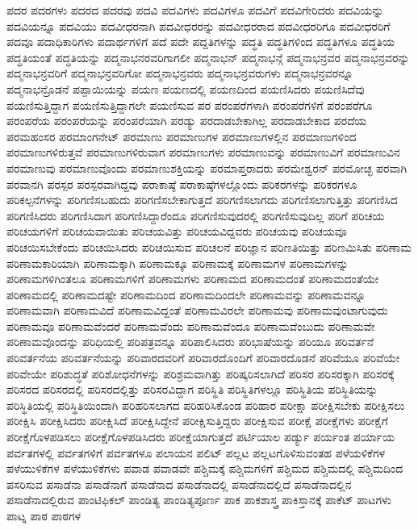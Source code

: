 {ಪದರ
ಪದರಗಳು
ಪದರದ
ಪದರವು
ಪದವಿ
ಪದವಿಗಳು
ಪದವಿಗಳೂ
ಪದವಿಗೆ
ಪದವಿಗೇರಿದರು
ಪದವಿಯನ್ನು
ಪದವಿಯನ್ನೂ
ಪದವಿಯು
ಪದವೀಧರನಾಗಿ
ಪದವೀಧರರನ್ನು
ಪದವೀಧರರಾದ
ಪದವೀಧರರಿಗೂ
ಪದವೀಧರರಿಗೆ
ಪದವೂ
ಪದಾಧಿಕಾರಿಗಳು
ಪದಾರ್ಥಗಳಿಗೆ
ಪದೆ
ಪದೇ
ಪದ್ದತಿಗಳನ್ನು
ಪದ್ಧತಿ
ಪದ್ಧತಿಗಳಿಂದ
ಪದ್ಧತಿಗಳೂ
ಪದ್ಧತಿಯ
ಪದ್ಧತಿಯಂತೆ
ಪದ್ಧತಿಯನ್ನು
ಪದ್ಮನಾಭನರವರಿಗಾಗಲೀ
ಪದ್ಮನಾಭನ್
ಪದ್ಮನಾಭನ್ಗೆ
ಪದ್ಮನಾಭನ್ರವರ
ಪದ್ಮನಾಭನ್ರವರನ್ನು
ಪದ್ಮನಾಭನ್ರವರಿಗೆ
ಪದ್ಮನಾಭನ್ರವರಿಗೋ
ಪದ್ಮನಾಭನ್ರವರು
ಪದ್ಮನಾಭನ್ರವರುಗಳು
ಪದ್ಮನಾಭನ್ರವರನ್ನೂ
ಪದ್ಮನಾಭನ್ರೊಡನೆ
ಪಪ್ಪಾಯಿಯನ್ನು
ಪಯಣ
ಪಯಣದಲ್ಲಿ
ಪಯಣದಿಂದ
ಪಯಣಿಸಿದರು
ಪಯಣಿಸಿದೆವು
ಪಯಣಿಸುತ್ತಿದ್ದಾಗ
ಪಯಣಿಸುತ್ತಿದ್ದಾಗಲೇ
ಪಯಣಿಸುವ
ಪರ
ಪರಂಪರೆಗಳಾಗಿ
ಪರಂಪರೆಗಳಿಗೆ
ಪರಂಪರೆಗೂ
ಪರಂಪರೆಯ
ಪರಂಪರೆಯನ್ನು
ಪರಂಪರೆಯಾಗಿ
ಪರಡ್ಯು
ಪರದಾಡಬೇಕಾಗಿಲ್ಲ
ಪರದಾಡಬೇಕಾದ
ಪರದೆಯ
ಪರಮಹಂಸರ
ಪರಮಾಂಗನೇಟ್
ಪರಮಾಣು
ಪರಮಾಣುಗಳ
ಪರಮಾಣುಗಳಲ್ಲಿನ
ಪರಮಾಣುಗಳಿಂದ
ಪರಮಾಣುಗಳಿರುತ್ತವೆ
ಪರಮಾಣುಗಳಿರುವಾಗ
ಪರಮಾಣುಗಳು
ಪರಮಾಣುವನ್ನು
ಪರಮಾಣುವಿಗೆ
ಪರಮಾಣುವಿನ
ಪರಮಾಣುವು
ಪರಮಾಣುವೊಂದು
ಪರಮಾಣುಶಕ್ತಿಯನ್ನು
ಪರಮಾಪ್ತರಾದರು
ಪರಮೇಶ್ವರನ್
ಪರಮೋಚ್ಛ
ಪರವಾಗಿ
ಪರವಾನಗಿ
ಪರಸ್ಪರ
ಪರಸ್ಪರವಾಗಿದ್ದವು
ಪರಾಕಾಷ್ಠೆ
ಪರಾಕಾಷ್ಠೆಗಳಲ್ಲೊಂದು
ಪರಿಕರಗಳನ್ನು
ಪರಿಕರಗಳೂ
ಪರಿಕಲ್ಪನೆಗಳನ್ನು
ಪರಿಗಣಿಸಬಹುದು
ಪರಿಗಣಿಸಬೇಕಾಗುತ್ತದೆ
ಪರಿಗಣಿಸಲಾಗದು
ಪರಿಗಣಿಸಲಾಗುತ್ತಿತ್ತು
ಪರಿಗಣಿಸಿದ
ಪರಿಗಣಿಸಿದರು
ಪರಿಗಣಿಸಿದಾಗ
ಪರಿಗಣಿಸಿದ್ದಾರೆಂದೂ
ಪರಿಗಣಿಸುವುದರಲ್ಲಿ
ಪರಿಗಣಿಸುವುದಿಲ್ಲ
ಪರಿಗೆ
ಪರಿಚಯ
ಪರಿಚಯಗಳಿಗೆ
ಪರಿಚಯವಾಯಿತು
ಪರಿಚಯವಿತ್ತು
ಪರಿಚಯವಿದ್ದವರು
ಪರಿಚಯವು
ಪರಿಚಯವೂ
ಪರಿಚಯಿಸಬೇಕೆಂದು
ಪರಿಚಯಿಸಿದರು
ಪರಿಚಯಿಸುವ
ಪರಿಚಲನೆ
ಪರಿಜ್ಞಾನ
ಪರಿಣತಿಯಿತ್ತು
ಪರಿಣಮಿಸಿತು
ಪರಿಣಾಮ
ಪರಿಣಾಮಕಾರಿಯಾಗಿ
ಪರಿಣಾಮಕ್ಕಾಗಿ
ಪರಿಣಾಮಕ್ಕೂ
ಪರಿಣಾಮಕ್ಕೆ
ಪರಿಣಾಮಗಳ
ಪರಿಣಾಮಗಳನ್ನು
ಪರಿಣಾಮಗಳಿಗಿಂತಲೂ
ಪರಿಣಾಮಗಳಿಗೆ
ಪರಿಣಾಮಗಳು
ಪರಿಣಾಮದ
ಪರಿಣಾಮದಂತೆ
ಪರಿಣಾಮದಂತೆಯೇ
ಪರಿಣಾಮದಲ್ಲಿ
ಪರಿಣಾಮದಷ್ಟೇ
ಪರಿಣಾಮದಿಂದ
ಪರಿಣಾಮದಿಂದಲೇ
ಪರಿಣಾಮವನ್ನು
ಪರಿಣಾಮವನ್ನೂ
ಪರಿಣಾಮವಾಗಿ
ಪರಿಣಾಮವಿದೆ
ಪರಿಣಾಮವಿದ್ದಂತೆ
ಪರಿಣಾಮವಿರಲೇ
ಪರಿಣಾಮವು
ಪರಿಣಾಮವುಂಟಾಗುವುದು
ಪರಿಣಾಮವೂ
ಪರಿಣಾಮವೆಂದರೆ
ಪರಿಣಾಮವೆಂದು
ಪರಿಣಾಮವೆಂದೂ
ಪರಿಣಾಮವೆಂಬುದು
ಪರಿಣಾಮವೇ
ಪರಿಣಾಮವೊಂದನ್ನು
ಪರಿಧಿಯಲ್ಲಿ
ಪರಿಪತ್ರವನ್ನೂ
ಪರಿಪಾಲಿಸಿದರು
ಪರಿಭಾಷೆಯನ್ನು
ಪರಿಯೂ
ಪರಿವರ್ತನೆ
ಪರಿವರ್ತನೆಯ
ಪರಿವರ್ತನೆಯನ್ನು
ಪರಿವಾರದವರಿಗೆ
ಪರಿವಾರದೊಂದಿಗೆ
ಪರಿವಾರದೊಡನೆ
ಪರಿವೆಯೂ
ಪರಿವೆಯೇ
ಪರಿವೇಯೇ
ಪರಿಶುದ್ಧತೆ
ಪರಿಶೋಧನೆಗಳನ್ನು
ಪರಿಶ್ರಮವಾಗಿತ್ತು
ಪರಿಷ್ಕರಿಸಲಾಗಿದೆ
ಪರಿಸರ
ಪರಿಸರಕ್ಕಾಗಿ
ಪರಿಸರಕ್ಕೆ
ಪರಿಸರದ
ಪರಿಸರದಲ್ಲಿ
ಪರಿಸರದಲ್ಲಿತ್ತು
ಪರಿಸರವಿದ್ದಾಗ
ಪರಿಸ್ಥಿತಿ
ಪರಿಸ್ಥಿತಿಗಳಲ್ಲೂ
ಪರಿಸ್ಥಿತಿಯ
ಪರಿಸ್ಥಿತಿಯನ್ನು
ಪರಿಸ್ಥಿತಿಯಲ್ಲಿ
ಪರಿಸ್ಥಿತಿಯಿಂದಾಗಿ
ಪರಿಹರಿಸಲಾಗದ
ಪರಿಹರಿಸಿಕೊಂಡ
ಪರಿಹಾರ
ಪರೀಕ್ಷಾ
ಪರೀಕ್ಷಿಸಬೇಕು
ಪರೀಕ್ಷಿಸಲು
ಪರೀಕ್ಷಿಸಿ
ಪರೀಕ್ಷಿಸಿದರು
ಪರೀಕ್ಷಿಸಿದೆ
ಪರೀಕ್ಷಿಸಿದ್ದೇನೆ
ಪರೀಕ್ಷಿಸುತ್ತಿದ್ದರು
ಪರೀಕ್ಷಿಸುವ
ಪರೀಕ್ಷೆ
ಪರೀಕ್ಷೆಗಳು
ಪರೀಕ್ಷೆಗೆ
ಪರೀಕ್ಷೆಗೊಳಪಡಿಸಲು
ಪರೀಕ್ಷೆಗೊಳಪಡಿಸಿದರು
ಪರೀಕ್ಷೆಯಾಗುತ್ತದೆ
ಪರ್ಟಿಯಾಲ
ಪರ್ಡ್ಯು
ಪರ್ಯಂತ
ಪರ್ಯಾಯ
ಪರ್ವತಗಳಲ್ಲಿ
ಪರ್ವತಗಳಿಗೆ
ಪರ್ವತಗಳೂ
ಪಲಾಯನ
ಪಲಿಟ್
ಪಲ್ಲಟ
ಪಲ್ಲಟಗೊಳಿಸುವಂತಹ
ಪಳೆಯಳಿಕೆಗಳ
ಪಳೆಯುಳಿಕೆಗಳ
ಪಳೆಯುಳಿಕೆಗಳು
ಪವಾಡ
ಪವಾಡವೇ
ಪಶ್ಚಿಮಕ್ಕೆ
ಪಶ್ಚಿಮಗಳಿಗೆ
ಪಶ್ಚಿಮದ
ಪಶ್ಚಿಮದಲ್ಲಿ
ಪಶ್ಚಿಮದಿಂದ
ಪಸರಿಸುವ
ಪಸಾಡೆನಾ
ಪಸಾಡೆನಾಗೆ
ಪಸಾಡೆನಾದ
ಪಸಾಡೆನಾದಲ್ಲಿ
ಪಸಾಡೆನಾದಲ್ಲಿದೆ
ಪಸಾಡೆನಾದಲ್ಲಿನ
ಪಸಾಡೆನಾದಲ್ಲಿರುವ
ಪಾಂಟಿಫಿಕಲ್
ಪಾಂಡಿತ್ಯ
ಪಾಂಡಿತ್ಯಪೂರ್ಣ
ಪಾಕ
ಪಾಕಶಾಸ್ತ್ರ
ಪಾಕಿಸ್ತಾನಕ್ಕೆ
ಪಾಕೆಟ್
ಪಾಟಗಳು
ಪಾಟ್ನ
ಪಾಠ
ಪಾಠಗಳ
}
